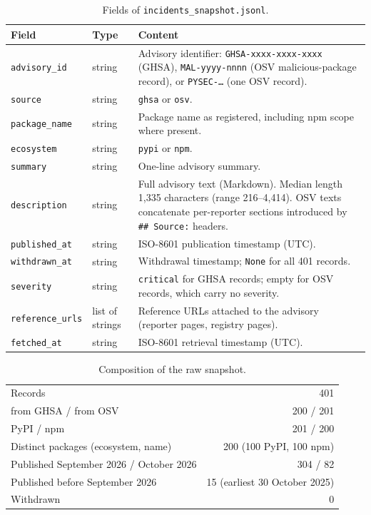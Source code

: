 \documentclass[preprint,12pt]{elsarticle}
\begin{document}
\begin{table}[h]
\centering
\caption{Fields of \texttt{incidents\_snapshot.jsonl}.}
\label{tab:schema}
\small
\begin{tabular}{>{\raggedright\arraybackslash}p{} >{\raggedright\arraybackslash}p{} >{\raggedright\arraybackslash}p{}}
\toprule
Field & Type & Content \\
\midrule
\texttt{advisory\_id} & string & Advisory identifier: \texttt{GHSA-xxxx-xxxx-xxxx} (GHSA), \texttt{MAL-yyyy-nnnn} (OSV malicious-package record), or \texttt{PYSEC-\ldots} (one OSV record). \\
\texttt{source} & string & \texttt{ghsa} or \texttt{osv}. \\
\texttt{package\_name} & string & Package name as registered, including npm scope where present. \\
\texttt{ecosystem} & string & \texttt{pypi} or \texttt{npm}. \\
\texttt{summary} & string & One-line advisory summary. \\
\texttt{description} & string & Full advisory text (Markdown). Median length 1,335 characters (range 216--4,414). OSV texts concatenate per-reporter sections introduced by \texttt{\#\# Source:} headers. \\
\texttt{published\_at} & string & ISO-8601 publication timestamp (UTC). \\
\texttt{withdrawn\_at} & string & Withdrawal timestamp; \texttt{None} for all 401 records. \\
\texttt{severity} & string & \texttt{critical} for GHSA records; empty for OSV records, which carry no severity. \\
\texttt{reference\_urls} & list of strings & Reference URLs attached to the advisory (reporter pages, registry pages). \\
\texttt{fetched\_at} & string & ISO-8601 retrieval timestamp (UTC). \\
\bottomrule
\end{tabular}
\end{table}

\begin{table}[h]
\centering
\caption{Composition of the raw snapshot.}
\label{tab:counts}
\small
\begin{tabular}{lr}
\toprule
Records & 401 \\
\quad from GHSA / from OSV & 200 / 201 \\
\quad PyPI / npm & 201 / 200 \\
Distinct packages (ecosystem, name) & 200 (100 PyPI, 100 npm) \\
Published September 2026 / October 2026 & 304 / 82 \\
Published before September 2026 & 15 (earliest 30 October 2025) \\
Withdrawn & 0 \\
\bottomrule
\end{tabular}
\end{table}
\end{document}
